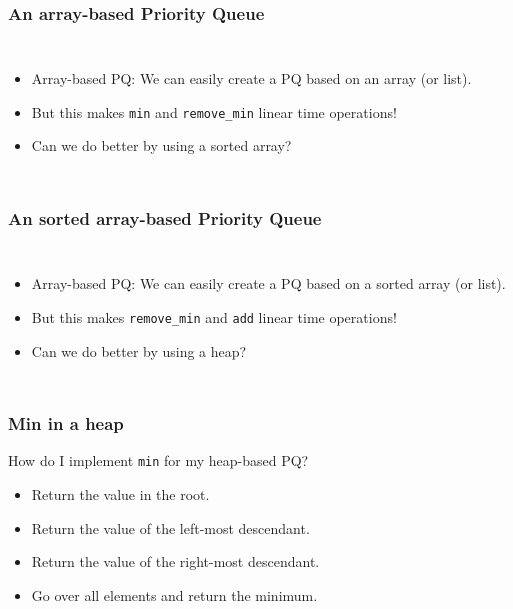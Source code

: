 \begin{frame}
	\frametitle{An array-based Priority Queue}


	\begin{columns}[T]
		
		
			\begin{itemize}
				\item Array-based PQ:	We can easily create a PQ based on an array (or list).
				\item But this makes \texttt{min} and \texttt{remove\_min} linear time operations!
				\item Can we do better by using a sorted array?
							\end{itemize}

	\end{columns}
\end{frame}

\begin{frame}
	\frametitle{An sorted array-based Priority Queue}

	\begin{columns}[T]
		
		
			\begin{itemize}
				\item Array-based PQ:	We can easily create a PQ based on a sorted array (or list).
				\item But this makes \texttt{remove\_min} and \texttt{add} linear time operations!
				\item Can we do better by using a heap?
			\end{itemize}
	\end{columns}
\end{frame}

\begin{frame}
	\frametitle{Min in a heap}
		How do I implement \texttt{min} for my heap-based PQ?
		\begin{itemize}
			\item Return the value in the root.
			\item Return the value of the left-most descendant.
			\item Return the value of the right-most descendant.
			\item Go over all elements and return the minimum.
		\end{itemize}

\end{frame}

